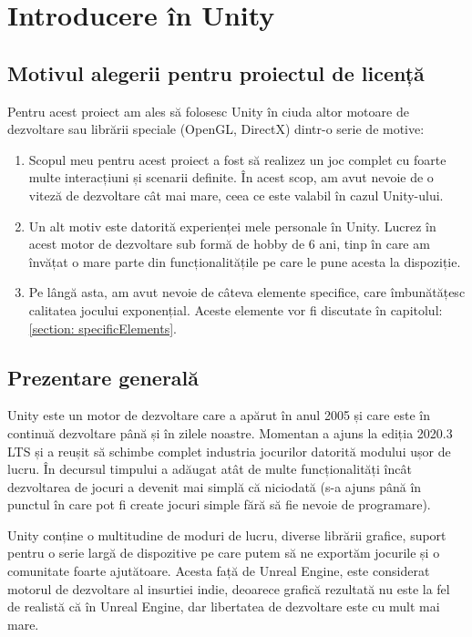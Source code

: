 \documentclass[12pt, a4paper]{article}
\begin{document}
	
	\section{Introducere în Unity}
	
	\subsection{Motivul alegerii pentru proiectul de licență}
	
	Pentru acest proiect am ales să folosesc Unity în ciuda altor motoare de dezvoltare sau librării speciale (OpenGL, DirectX) dintr-o serie de motive:
	
	\begin{enumerate}
		\item Scopul meu pentru acest proiect a fost să realizez un joc complet cu foarte multe interacțiuni și scenarii definite. În acest scop, am avut nevoie de o viteză de dezvoltare cât mai mare, ceea ce este valabil în cazul Unity-ului.
		\item Un alt motiv este datorită experienței mele personale în Unity. Lucrez în acest motor de dezvoltare sub formă de hobby de 6 ani, tinp în care am învățat o mare parte din funcționalitățile pe care le pune acesta la dispoziție.
		\item Pe lângă asta, am avut nevoie de câteva elemente specifice, care îmbunătățesc calitatea jocului exponențial. Aceste elemente vor fi discutate în capitolul: \ref{section: specificElements}.
	\end{enumerate}
	
	
	
	
	
	\subsection{Prezentare generală}
	
	Unity este un motor de dezvoltare care a apărut în anul 2005 și care este în continuă dezvoltare până și în zilele noastre. Momentan a ajuns la ediția 2020.3 LTS și a reușit să schimbe complet industria jocurilor datorită modului ușor de lucru. În decursul timpului a adăugat atât de multe funcționalități încât dezvoltarea de jocuri a devenit mai simplă că niciodată (s-a ajuns până în punctul în care pot fi create jocuri simple fără să fie nevoie de programare).
	\newline
	
	Unity conține o multitudine de moduri de lucru, diverse librării grafice, suport pentru o serie largă de dispozitive pe care putem să ne exportăm jocurile și o comunitate foarte ajutătoare. Acesta față de Unreal Engine, este considerat motorul de dezvoltare al insurtiei indie, deoarece grafică rezultată nu este la fel de realistă că în Unreal Engine, dar libertatea de dezvoltare este cu mult mai mare.
	\newline
	
\end{document}
